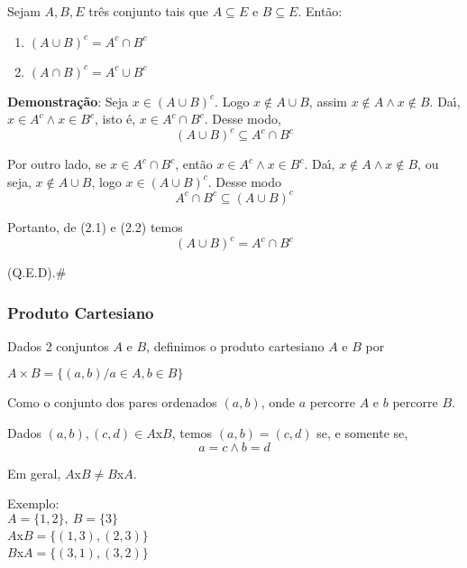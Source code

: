 \begin{proposicao} Sejam $A,B,E$ tr{\^e}s conjunto tais que $A\subseteq E$ e $B\subseteq E$. Ent{\~a}o:
\begin{enumerate}
\item $(A\cup B)^{c}=A^{c}\cap B^{c}$
\item $(A\cap B)^{c}=A^{c}\cup B^{c}$
\end{enumerate}
\end{proposicao}

\textbf{Demonstra{\c c}{\~a}o}: Seja $x\in(A\cup B)^{c}$. Logo $x\notin A\cup B$, assim $x\notin A\wedge x\notin B$. Da{\'\i}, $x\in A^{c}\wedge x\in B^{c}$, isto {\'e}, $x\in A^{c}\cap B^{c}$. Desse modo,
\begin{equation}
(A\cup B)^{c}\subseteq A^{c}\cap B^{c}
\end{equation}

Por outro lado, se $x\in A^{c}\cap B^{c}$, ent{\~a}o $x\in A^{c}\wedge x\in B^{c}$. Da{\'\i}, $x\notin A\wedge x\notin B$, ou seja, $x\notin A\cup B$, logo $x\in (A\cup B)^{c}$. Desse modo
\begin{equation}
A^{c}\cap B^{c}\subseteq(A\cup B)^{c}
\end{equation}

Portanto, de (2.1) e (2.2) temos \[(A\cup B)^{c}=A^{c}\cap B^{c}\]

(Q.E.D).\#\\

\subsubsection{Produto Cartesiano}

\begin{definicao} Dados 2 conjuntos $A$ e $B$, definimos o produto cartesiano $A$ e $B$ por
\begin{center}
$A\times B=\{(a,b)/a\in A,b\in B\}$
\end{center}
\end{definicao}

Como o conjunto dos pares ordenados $(a,b)$, onde $a$ percorre $A$ e $b$ percorre $B$.

Dados $(a,b),(c,d)\in A$x$B$, temos $(a,b)=(c,d)$ se, e somente se, \[a=c\wedge b=d\]

Em geral, $A$x$B\neq B$x$A$.

Exemplo:\\
$A=\{1,2\},\ B=\{3\}$\\
$A$x$B=\{(1,3),(2,3)\}$\\
$B$x$A=\{(3,1),(3,2)\}$

